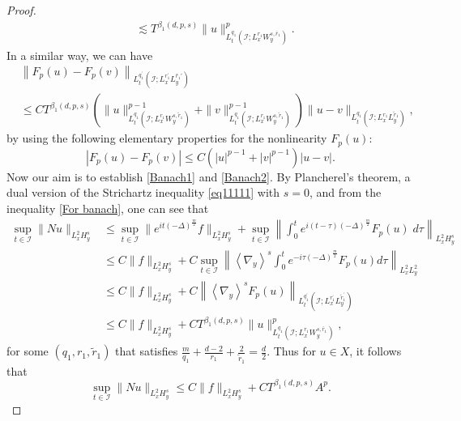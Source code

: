\documentclass[10pt,a4paper]{amsart}
\begin{document}
\begin{proof}
\begin{align}
			&\lesssim  T^{\beta_1(d, p, s)}  \|u\|_{L_t^{q_1}\left(\mathcal{I} ; L_x^{r_1} W_y^{s, \bar{r}_1}\right)}^p.
		\end{align}
		In a similar way, we can have
		\begin{align}\label{To prove 2}\nonumber
			& \left\|F_p(u)-F_p(v)\right\|_{L_t^{q_1^{\prime}}\left(\mathcal{I}; L_x^{r_1^{\prime}} L_y^{\tilde{r_1}'}\right)} \\
			& \leq C T^{\beta_1(d, p, s)}\left(\|u\|_{L_t^{q_1}\left(\mathcal{I}; L_x^{r_1} W_y^{s, \tilde{r}_1}\right)}^{p-1}+\|v\|_{L_t^{q_1}\left(\mathcal{I} ; L_x^{r_1} W_y^{s, \tilde{r}_1}\right)}^{p-1}\right)\|u-v\|_{L_t^{q_1}\left(\mathcal{I}; L_x^{r_1} L_y^{\tilde{r}_1}\right)},
		\end{align} 
        by using the following elementary properties for the nonlinearity $F_p(u):$
        \begin{equation}
            |F_p(u)-F_p(v)| \leq C (|u|^{p-1}+|v|^{p-1}) |u-v|.
        \end{equation}
		Now our aim is to establish \eqref{Banach1} and \eqref{Banach2}. 
		By Plancherel's theorem, a dual version of  the Strichartz inequality \eqref{eq11111} with $s=0$, and from the inequality  \eqref{For banach}, one can see that 
		$$
		\begin{aligned}
			\sup _{t \in \mathcal{I}}\|Nu \|_{L_x^2 H_y^s} & \leq 
			\sup _{t \in \mathcal{I}} 	\|	e^{i t (-\Delta)^{\frac{m}{2}}} f \|_{L_x^2 H_y^s} +	\sup _{t \in \mathcal{I}}\left \| \int_0^t e^{i(t-\tau) (-\Delta)^{\frac{m}{2}}} F_p(u)\; d \tau \right\|_{L_x^2 H_y^s}\\ 		
			& \leq C\|f\|_{L_x^2 H_y^s}+C	\sup _{t \in \mathcal{I}} \left\|\left\langle\nabla_y\right\rangle^s \int_0^t e^{-i \tau (-\Delta)^{\frac{m}{2}}} F_p(u) d \tau\right\|_{L_x^2 L_y^2} \\
			& \leq C\|f\|_{L_x^2 H_y^s}+C\left\|\left\langle\nabla_y\right\rangle^s F_p(u)\right\|_{L_t^{q_1^{\prime}}\left(\mathcal{I} ; L_x^{r_1^{\prime}} L_y^{\tilde{r}_1^{\prime}}\right)}\\
			&	\leq C\|f\|_{L_x^2 H_y^s}+C	T^{\beta_1(d, p, s)}  \|u\|_{L_t^{q_1}\left(\mathcal{I} ; L_x^{r_1} W_y^{s, \bar{r}_1}\right)}^p,
		\end{aligned}
		$$
		for some $\left(q_1, r_1, \widetilde{r}_1\right) $  that satisfies 		$\frac{{{m}}}{q_1}+\frac{d-2}{r_1}+\frac{2}{\widetilde{r}_1}=\frac{d}{2}.$  Thus for $u \in X$, it follows that
		\begin{equation}\label{final1}
		    \sup _{t \in \mathcal{I}}\|Nu \|_{L_x^2 H_y^s} 	\leq C\|f\|_{L_x^2 H_y^s}+C	T^{\beta_1(d, p, s)} A^p.
		\end{equation}	 
		

\end{proof}
\end{document}
